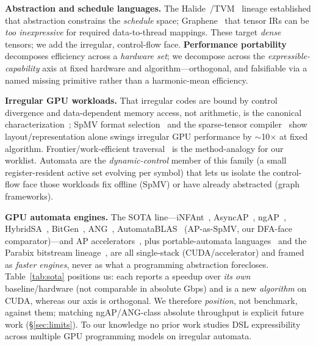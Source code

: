 \documentclass[conference]{IEEEtran}
\begin{document}
\textbf{Abstraction and schedule languages.} The Halide~\cite{halide}/TVM~\cite{tvm} lineage
established that abstraction constrains the \emph{schedule} space; Graphene~\cite{graphene}
that tensor IRs can be \emph{too inexpressive} for required data-to-thread mappings. These
target \emph{dense} tensors; we add the irregular, control-flow face. \textbf{Performance
portability}~\cite{pennycook} decomposes efficiency across a \emph{hardware set}; we decompose
across the \emph{expressible-capability} axis at fixed hardware and algorithm---orthogonal, and
falsifiable via a named missing primitive rather than a harmonic-mean efficiency.

\textbf{Irregular GPU workloads.} That irregular codes are bound by control divergence and
data-dependent memory access, not arithmetic, is the canonical
characterization~\cite{burtscher}; SpMV format selection~\cite{bestsf,sparsetir} and the
sparse-tensor compiler~\cite{taco} show layout/representation alone swings irregular GPU
performance by $\sim$10$\times$ at fixed algorithm. Frontier/work-efficient
traversal~\cite{merrill,gunrock} is the method-analogy for our worklist. Automata are the
\emph{dynamic-control} member of this family (a small register-resident active set evolving per
symbol) that lets us isolate the control-flow face those workloads fix offline (SpMV) or have
already abstracted (graph frameworks).

\textbf{GPU automata engines.} The SOTA line---iNFAnt~\cite{infant}, AsyncAP~\cite{asyncap},
ngAP~\cite{ngap}, HybridSA~\cite{hybridsa}, BitGen~\cite{bitgen}, ANG~\cite{ang},
AutomataBLAS~\cite{automatablas} (AP-as-SpMV, our DFA-face comparator)---and AP
accelerators~\cite{hopps}, plus portable-automata languages~\cite{rapid} and the Parabix
bitstream lineage~\cite{parabix}, are all single-stack (CUDA/accelerator) and framed as
\emph{faster engines}, never as what a programming abstraction forecloses. Table~\ref{tab:sota}
positions us: each reports a speedup over \emph{its own} baseline/hardware (not comparable in
absolute Gbps) and is a new \emph{algorithm} on CUDA, whereas our axis is orthogonal. We
therefore \emph{position}, not benchmark, against them; matching ngAP/ANG-class absolute
throughput is explicit future work (\S\ref{sec:limits}). To our knowledge no prior work studies
DSL expressibility across multiple GPU programming models on irregular automata.
\end{document}
